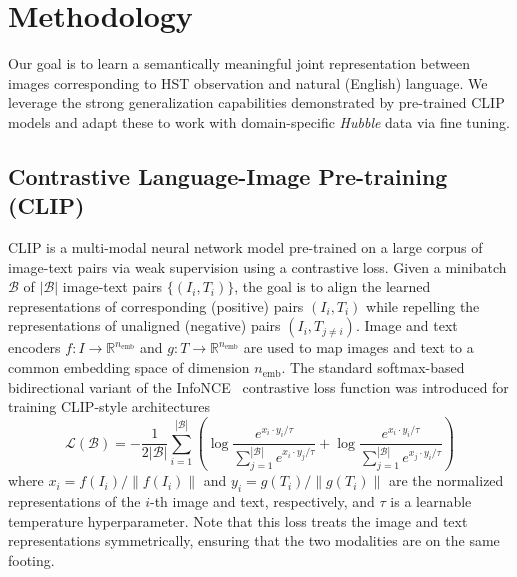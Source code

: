 \documentclass[10pt]{article} %
\newcommand{\hubble}{\emph{Hubble}\xspace}
\begin{document}
\section{Methodology}
\label{sec:methodology}

Our goal is to learn a semantically meaningful joint representation between images corresponding to HST observation and natural (English) language.
%
We leverage the strong generalization capabilities demonstrated by pre-trained CLIP models and adapt these to work with domain-specific \hubble data via fine tuning.

\subsection{Contrastive Language-Image Pre-training (CLIP)}

CLIP \citep[Contrastive Language-Image Pre-training;][]{radford2021learning} is a multi-modal neural network model pre-trained on a large corpus of image-text pairs via weak supervision using a contrastive loss.
%
Given a minibatch $\mathcal{B}$ of $|\mathcal{B}|$ image-text pairs $\{(I_i, T_i)\}$, the goal is to align the learned representations of corresponding (positive) pairs $(I_i, T_i)$ while repelling the representations of unaligned (negative) pairs $(I_i, T_{j\neq i})$.
%
Image and text encoders $f: I \rightarrow \mathbb R^{n_\text{emb}}$ and $g: T \rightarrow \mathbb R^{n_\text{emb}}$ are used to map images and text to a common embedding space of dimension $n_\text{emb}$.
%
The standard softmax-based bidirectional variant of the InfoNCE~\citep{oord2018representation} contrastive loss function was introduced for training CLIP-style architectures \citep{radford2021learning}
%
\begin{equation}
  \mathcal{L}(\mathcal{B})=-\frac{1}{2|\mathcal{B}|} \sum_{i=1}^{|\mathcal{B}|}\left(\log \frac{e^{x_i \cdot y_i / \tau}}{\sum_{j=1}^{|\mathcal{B}|} e^{x_i \cdot y_j / \tau}}+\log \frac{e^{x_i \cdot y_i / \tau}}{\sum_{j=1}^{|\mathcal{B}|} e^{x_j \cdot y_i / \tau}}\right)\label{eq:softmax_loss}
\end{equation}
%
where ${x}_i={f\left(I_i\right)}/{\left\|f\left(I_i\right)\right\|}$ and ${y}_i={g\left(T_i\right)}/{\left\|g\left(T_i\right)\right\|}$ are the normalized representations of the $i$-th image and text, respectively, and $\tau$ is a learnable temperature hyperparameter.
%
Note that this loss treats the image and text representations symmetrically, ensuring that the two modalities are on the same footing.
\end{document}
